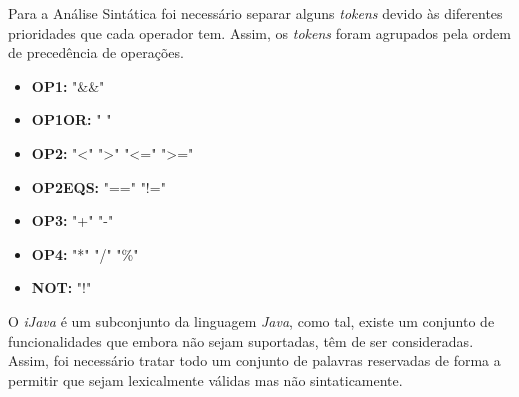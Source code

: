 \documentclass[12pt]{article}
\begin{document}
	    Para a Análise Sintática foi necessário separar alguns \emph{tokens} devido às diferentes prioridades que cada operador tem. Assim, os \emph{tokens} foram agrupados pela ordem de precedência de operações.
		\begin{itemize}  
	        \item \textbf{OP1:} "\&\&"  
	        \item \textbf{OP1OR:} "\text{\textbar} \text{\textbar}"
	        \item \textbf{OP2:} "\textless" \text{\textbar} "\textgreater" \text{\textbar} "\textless=" \text{\textbar} "\textgreater="
	        \item \textbf{OP2EQS:} "==" \text{\textbar} "!="	        
	        \item \textbf{OP3:} "+" \text{\textbar} "-"
	        \item \textbf{OP4:} "*" \text{\textbar} "/" \text{\textbar} "\%"
	        \item \textbf{NOT:} "!"
	        \end{itemize}
	         O \emph{iJava} é um subconjunto da linguagem \emph{Java}, como tal, existe um conjunto de funcionalidades que embora não sejam suportadas, têm de ser consideradas. Assim, foi necessário tratar todo um conjunto de palavras reservadas de forma a permitir que sejam lexicalmente válidas mas não sintaticamente.
\end{document}
